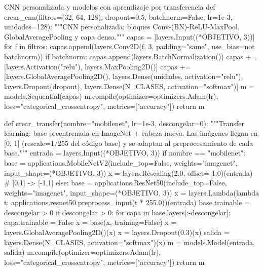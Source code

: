 \documentclass[11pt,letterpaper]{article}
\begin{document}
\begin{codigo}[label=cod:modelos]{CNN personalizada y modelos con aprendizaje por transferencia}
def crear_cnn(filtros=(32, 64, 128), dropout=0.5, batchnorm=False, lr=1e-3, unidades=128):
    """CNN personalizada: bloques Conv-(BN)-ReLU-MaxPool, GlobalAveragePooling y capa densa."""
    capas = [layers.Input((*OBJETIVO, 3))]
    for f in filtros:
        capas.append(layers.Conv2D(f, 3, padding="same", use_bias=not batchnorm))
        if batchnorm:
            capas.append(layers.BatchNormalization())
        capas += [layers.Activation("relu"), layers.MaxPooling2D()]
    capas += [layers.GlobalAveragePooling2D(), layers.Dense(unidades, activation="relu"),
              layers.Dropout(dropout), layers.Dense(N_CLASES, activation="softmax")]
    m = models.Sequential(capas)
    m.compile(optimizer=optimizers.Adam(lr), loss="categorical_crossentropy", metrics=["accuracy"])
    return m


def crear_transfer(nombre="mobilenet", lr=1e-3, descongelar=0):
    """Transfer learning: base preentrenada en ImageNet + cabeza nueva.
    Las imágenes llegan en [0, 1] (rescale=1/255 del código base) y se adaptan al preprocesamiento de cada base."""
    entrada = layers.Input((*OBJETIVO, 3))
    if nombre == "mobilenet":
        base = applications.MobileNetV2(include_top=False, weights="imagenet", input_shape=(*OBJETIVO, 3))
        x = layers.Rescaling(2.0, offset=-1.0)(entrada)                       # [0,1] -> [-1,1]
    else:
        base = applications.ResNet50(include_top=False, weights="imagenet", input_shape=(*OBJETIVO, 3))
        x = layers.Lambda(lambda t: applications.resnet50.preprocess_input(t * 255.0))(entrada)
    base.trainable = descongelar > 0
    if descongelar > 0:
        for capa in base.layers[:-descongelar]:
            capa.trainable = False
    x = base(x, training=False)
    x = layers.GlobalAveragePooling2D()(x)
    x = layers.Dropout(0.3)(x)
    salida = layers.Dense(N_CLASES, activation="softmax")(x)
    m = models.Model(entrada, salida)
    m.compile(optimizer=optimizers.Adam(lr), loss="categorical_crossentropy", metrics=["accuracy"])
    return m
\end{codigo}
\end{document}
